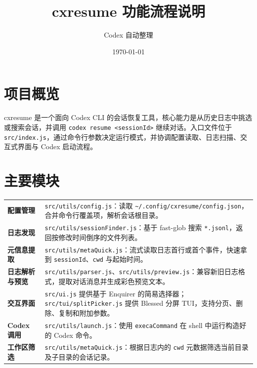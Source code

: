 \documentclass[12pt]{article}
\title{cxresume 功能流程说明}
\author{Codex 自动整理}
\date{\today}
\begin{document}
\maketitle

\section{项目概览}
cxresume 是一个面向 Codex CLI 的会话恢复工具，核心能力是从历史日志中挑选或搜索会话，并调用 \texttt{codex resume <sessionId>} 继续对话。入口文件位于 \texttt{src/index.js}，通过命令行参数决定运行模式，并协调配置读取、日志扫描、交互式界面与 Codex 启动流程。

\section{主要模块}
\begin{longtable}{>{\raggedright\arraybackslash}p{}p{}}
\textbf{配置管理} & \texttt{src/utils/config.js}：读取 \texttt{\~{}/.config/cxresume/config.json}，合并命令行覆盖项，解析会话根目录。 \\
\textbf{日志发现} & \texttt{src/utils/sessionFinder.js}：基于 fast-glob 搜索 \texttt{*.jsonl}，返回按修改时间倒序的文件列表。 \\
\textbf{元信息提取} & \texttt{src/utils/metaQuick.js}：流式读取日志首行或首个事件，快速拿到 \texttt{sessionId}、\texttt{cwd} 与起始时间。 \\
\textbf{日志解析与预览} & \texttt{src/utils/parser.js}、\texttt{src/utils/preview.js}：兼容新旧日志格式，提取对话消息并生成彩色预览文本。 \\
\textbf{交互界面} & \texttt{src/ui.js} 提供基于 Enquirer 的简易选择器；\texttt{src/tui/splitPicker.js} 提供 Blessed 分屏 TUI，支持分页、删除、复制和附加参数。 \\
\textbf{Codex 调用} & \texttt{src/utils/launch.js}：使用 \texttt{execaCommand} 在 shell 中运行构造好的 Codex 命令。 \\
\textbf{工作区筛选} & \texttt{src/utils/metaQuick.js}：根据日志内的 \texttt{cwd} 元数据筛选当前目录及子目录的会话记录。 \\
\end{longtable}
\end{document}
